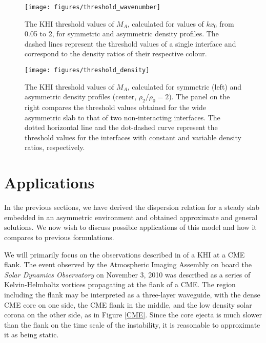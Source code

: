 \begin{figure}[!t]
\centering
\texttt{[image: figures/threshold\_wavenumber]}
\caption{The KHI threshold values of $M_A$, calculated for values of $k x_0$ from 0.05 to 2, for symmetric and asymmetric density profiles. The dashed lines represent the threshold values of a single interface and correspond to the density ratios of their respective colour.}
\label{fig:threshold_wavenumber}
\end{figure}

\begin{figure}[!t]
\centering
\texttt{[image: figures/threshold\_density]}
\caption{The KHI threshold values of $M_A$, calculated for symmetric (left) and asymmetric density profiles (center, $\rho_2/\rho_0=2$).
The panel on the right compares the threshold values obtained for the wide asymmetric slab to that of two non-interacting interfaces.
The dotted horizontal line and the dot-dashed curve represent the threshold values for the interfaces with constant and variable density ratios, respectively.}
\label{fig:threshold_density}
\end{figure}



\section{Applications}
\label{sec:c2app}

In the previous sections, we have derived the dispersion relation for a steady slab embedded in an asymmetric environment and obtained approximate and general solutions.
We now wish to discuss possible applications of this model and how it compares to previous formulations.

We will primarily focus on the observations described in \cite{Foullon2011} of a KHI at a CME flank.
The event observed by the Atmospheric Imaging Assembly on board the \textit{Solar Dynamics Observatory} on November 3, 2010 was described as a series of Kelvin-Helmholtz vortices propagating at the flank of a CME.
The region including the flank may be interpreted as a three-layer waveguide, with the dense CME core on one side, the CME flank in the middle, and the low density solar corona on the other side, as in Figure \ref{CME}.
Since the core ejecta is much slower than the flank on the time scale of the instability, it is reasonable to approximate it as being static.

